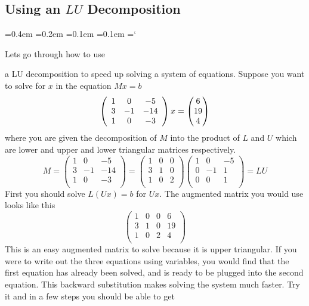 
\subsection*{Using an $LU$ Decomposition}

{\ttfamily
{}\font=0.4em
\font=0.2em
\font=0.1em
\font=0.1em
\hyphenchar\font=`\-


\hypertarget{scripts_lu_decomposition_using_lu_example}{Lets go through how to use} a LU decomposition to speed up solving a system of equations. Suppose you want to solve for $x$ in the equation $Mx=b$
\[
\left( \begin{array}{ccc}
1 & 0 & -5 \\
3 & -1 & -14  \\
 1&  0& -3\\
\end{array} \right) x
= \begin{pmatrix} 6 \\ 19\\ 4 \end{pmatrix}
\]
where you are given the decomposition of $M$ into the product of $L$ and $U$ which are lower and upper and lower triangular matrices respectively.
\[
M =
\left( \begin{array}{ccc}
1 & 0 & -5 \\
3 & -1 & -14  \\
 1&  0& -3\\
\end{array} \right)
=
\left( \begin{array}{ccc}
1 & 0 & 0 \\
3 & 1 &0  \\
 1&  0& 2\\
\end{array} \right)
\left( \begin{array}{ccc}
1 & 0 & -5  \\
0 & -1 &1  \\
0 & 0 & 1\\
\end{array} \right)
=LU
\]
 First you should solve $L(Ux) =b$ for $Ux$. The augmented matrix you would use looks like this 
 \[
 \left( \begin{array}{ccc|c}
1 & 0 & 0 & 6\\
3 & 1 & 0 &19\\
1 & 0 & 2 & 4\\
\end{array} \right)
 \]
 This is an easy augmented matrix to solve because it is upper triangular. If you were to write out the three equations using variables, you would find that the first equation has already been solved, and is ready to be plugged into the second equation. This backward substitution makes solving the system much faster. Try it and in a few steps you should be able to get 
}
